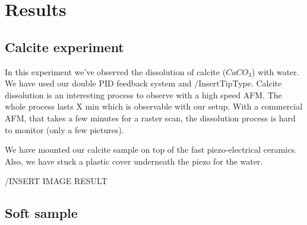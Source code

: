 \chapter{Results}


\section{Calcite experiment}

In this experiment we've observed the dissolution of calcite ($CaCO_3$) with water. We have used our double PID feedback system and /InsertTipType. Calcite dissolution is an interesting process to observe with a high speed AFM. The whole process lasts X min which is observable with our setup. With a commercial AFM, that takes a few minutes for a raster scan, the dissolution process is hard to monitor (only a few pictures).

We have mounted our calcite sample on top of the fast piezo-electrical ceramics. Also, we have stuck a plastic cover underneath the piezo for the water.

/INSERT IMAGE RESULT
\cite{hillner1992atomic}

\section{Soft sample}